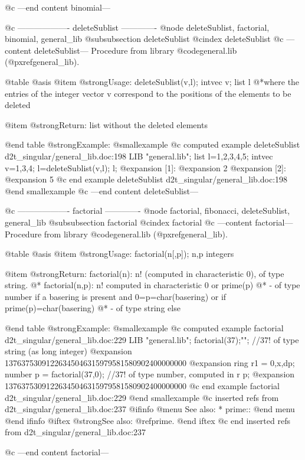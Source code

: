 @c ---end content binomial---

@c ------------------- deleteSublist -------------
@node deleteSublist, factorial, binomial, general_lib
@subsubsection deleteSublist
@cindex deleteSublist
@c ---content deleteSublist---
Procedure from library @code{general.lib} (@pxref{general_lib}).

@table @asis
@item @strong{Usage:}
deleteSublist(v,l); intvec v; list l
@*where the entries of the integer vector v correspond to the
positions of the elements to be deleted

@item @strong{Return:}
list without the deleted elements

@end table
@strong{Example:}
@smallexample
@c computed example deleteSublist d2t_singular/general_lib.doc:198 
LIB "general.lib";
list l=1,2,3,4,5;
intvec v=1,3,4;
l=deleteSublist(v,l);
l;
@expansion{} [1]:
@expansion{}    2
@expansion{} [2]:
@expansion{}    5
@c end example deleteSublist d2t_singular/general_lib.doc:198
@end smallexample
@c ---end content deleteSublist---

@c ------------------- factorial -------------
@node factorial, fibonacci, deleteSublist, general_lib
@subsubsection factorial
@cindex factorial
@c ---content factorial---
Procedure from library @code{general.lib} (@pxref{general_lib}).

@table @asis
@item @strong{Usage:}
factorial(n[,p]); n,p integers

@item @strong{Return:}
factorial(n): n! (computed in characteristic 0), of type string.
@* factorial(n,p): n! computed in characteristic 0 or prime(p)
@* - of type number if a basering is present and 0=p=char(basering)
or if prime(p)=char(basering)
@* - of type string else

@end table
@strong{Example:}
@smallexample
@c computed example factorial d2t_singular/general_lib.doc:229 
LIB "general.lib";
factorial(37);"";                 //37! of type string (as long integer)
@expansion{} 13763753091226345046315979581580902400000000
@expansion{} 
ring r1 = 0,x,dp;
number p = factorial(37,0);       //37! of type number, computed in r
p;
@expansion{} 13763753091226345046315979581580902400000000
@c end example factorial d2t_singular/general_lib.doc:229
@end smallexample
@c inserted refs from d2t_singular/general_lib.doc:237
@ifinfo
@menu
See also:
* prime::
@end menu
@end ifinfo
@iftex
@strong{See also:}
@ref{prime}.
@end iftex
@c end inserted refs from d2t_singular/general_lib.doc:237

@c ---end content factorial---

